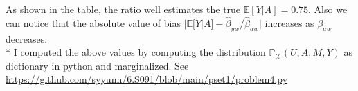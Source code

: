 \documentclass[10pt]{article}
\begin{document}
As shown in the table, the ratio well estimates the true $\mathbb{E}[Y|A]=0.75$. Also we can notice that the absolute value of bias $|\mathbb{E}[Y|A] - \widehat{\beta}_{y w} / \widehat{\beta}_{a w}|$ increases as $\beta_{aw}$ decreases.\\


* I computed the above values by computing the distribution $\mathbb{P}_{\mathcal{X}}(U, A, M, Y)$ as dictionary in python and marginalized. 
See \url{https://github.com/syyunn/6.S091/blob/main/pset1/problem4.py}



\end{document}
